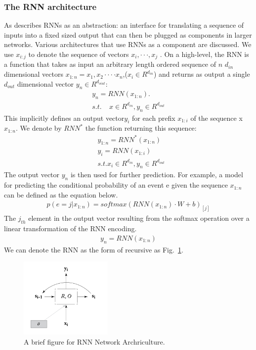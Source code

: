 \documentclass{article}
\begin{document}
\subsubsection{The RNN architecture}
As describes RNNs as an abstraction: an interface for translating a sequence of inputs into a fixed sized output that can then be plugged as components in larger networks. Various architectures that use RNNs as a component are discussed.
We use $x_{i:j}$ to denote the sequence of vectors $x_i,\cdot\cdot\cdot,x_j$ . On a high-level, the RNN is a function that takes as input an arbitrary length ordered sequence of $n$ $d_{in}$ dimensional vectors $x_{1:n}=x_1,x_2\cdot\cdot\cdot\cdot x_n$,($x_i \in R^{d_{in}}$) and returns as output a single $d_{out}$ dimensional vector $y_n \in R^{d_{oiut}}$:
\begin{align}
	y_n=RNN(x_{1:n}).\\  s.t.  \ \ \ \ \ x \in R^{d_{in}} ,y_n \in R^{d_{out}}
\end{align}
This implicitly defines an output vector$y_i$ for each prefix $x_{1:i}$ of the sequence x $x_{1:n}$. We denote by $RNN^*$ the function returning this sequence:
\begin{align}
	& y_{1:n}=RNN^*(x_{1:n})\\  & y_i=RNN(x_{1:i})\\ &s.t.  x_i\in R^{d_{in}},y_n \in R^{d_{out}}
\end{align}
The output vector $y_n$  is then used for further prediction. For example, a model for predicting the conditional probability of an event e given the sequence $x_{1:n}$ can be defined as the equation below.
\begin{align}
	p(e=j|x_{1:n})={softmax(RNN(x_{1:n})\cdot W+b)}_{[j]}
\end{align}
The $j_{th}$ element in the output vector resulting from the softmax operation over a linear transformation of the RNN encoding.
\begin{align}
	y_n=RNN(x_{1:n})
\end{align}
We can denote the RNN as the form of recursive as Fig.~\ref{fig:RNN_figure}.

\begin{figure}[!htp]
	\begin{centering}
		\includegraphics[width=0.4\textwidth]{RNN_recursive.png}
		\caption{A brief figure for RNN Network Archriculture.}
		\label{fig:RNN_figure} 
	\end{centering}
\end{figure}
\end{document}
